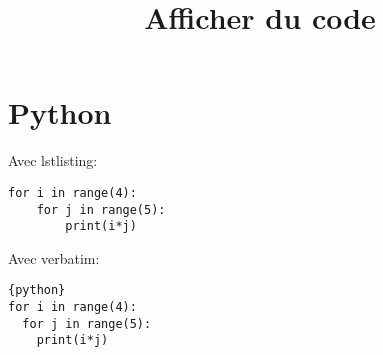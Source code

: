 \documentclass[a4paper,11pt]{article}
\begin{document}
\title{Afficher du code}
\date{}
\maketitle

\section{Python}

\lstset{language=Python}


Avec lstlisting:\par
\begin{lstlisting}
for i in range(4):
    for j in range(5):
        print(i*j)
\end{lstlisting}


Avec verbatim:\par
\begin{verbatim}{python}
for i in range(4):
  for j in range(5):
    print(i*j)
\end{verbatim}
\end{document}
